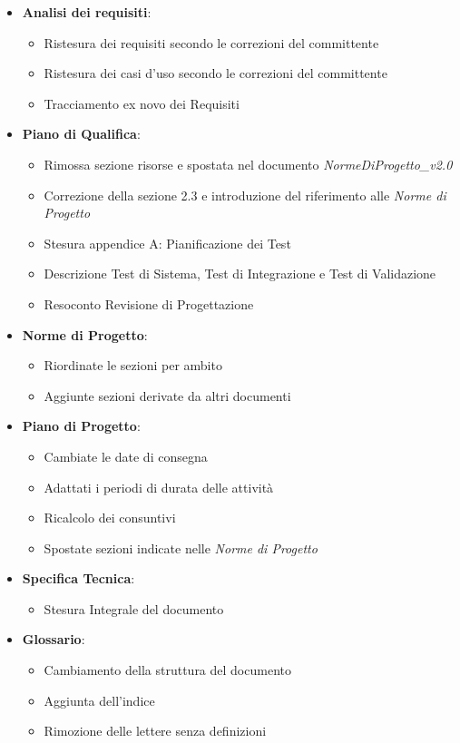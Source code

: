 \begin{itemize}
	\item \textbf{Analisi dei requisiti}:
	\begin{itemize}
		\item Ristesura dei requisiti secondo le correzioni del committente
		\item Ristesura dei casi d'uso secondo le correzioni del committente
		\item Tracciamento ex novo dei Requisiti
	\end{itemize}
	\item \textbf{Piano di Qualifica}:
	\begin{itemize}
		\item Rimossa sezione risorse e spostata nel documento \textit{NormeDiProgetto\_v2.0}
		\item Correzione della sezione 2.3 e introduzione del riferimento alle \textit{Norme di Progetto}
		\item Stesura appendice A: Pianificazione dei Test
		\item Descrizione Test di Sistema, Test di Integrazione e Test di Validazione
		\item Resoconto Revisione di Progettazione
	\end{itemize}
	\item \textbf{Norme di Progetto}:
	\begin{itemize}
		\item Riordinate le sezioni per ambito
		\item Aggiunte sezioni derivate da altri documenti
	\end{itemize}
	\item \textbf{Piano di Progetto}:
	\begin{itemize}
		\item Cambiate le date di consegna
		\item Adattati i periodi di durata delle attività
		\item Ricalcolo dei consuntivi
		\item Spostate sezioni indicate nelle \textit{Norme di Progetto}
	\end{itemize}	
	\item \textbf{Specifica Tecnica}:
	\begin{itemize}
		\item Stesura Integrale del documento
	\end{itemize}	
	\item \textbf{Glossario}:
	\begin{itemize}
		\item Cambiamento della struttura del documento
		\item Aggiunta dell'indice
		\item Rimozione delle lettere senza definizioni
	\end{itemize}
\end{itemize}